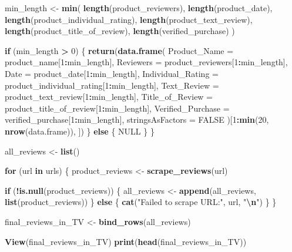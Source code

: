 \documentclass[
  11pt,
]{article}
\newenvironment{Shaded}{\begin{snugshade}}{\end{snugshade}}
\newcommand{\AttributeTok}[1]{\textcolor[rgb]{0.13,0.29,0.53}{#1}}
\newcommand{\ConstantTok}[1]{\textcolor[rgb]{0.56,0.35,0.01}{#1}}
\newcommand{\ControlFlowTok}[1]{\textcolor[rgb]{0.13,0.29,0.53}{\textbf{#1}}}
\newcommand{\DecValTok}[1]{\textcolor[rgb]{0.00,0.00,0.81}{#1}}
\newcommand{\FunctionTok}[1]{\textcolor[rgb]{0.13,0.29,0.53}{\textbf{#1}}}
\newcommand{\NormalTok}[1]{#1}
\newcommand{\OtherTok}[1]{\textcolor[rgb]{0.56,0.35,0.01}{#1}}
\newcommand{\SpecialCharTok}[1]{\textcolor[rgb]{0.81,0.36,0.00}{\textbf{#1}}}
\newcommand{\StringTok}[1]{\textcolor[rgb]{0.31,0.60,0.02}{#1}}
\begin{document}
\begin{Shaded}
\begin{Highlighting}[]
  
\NormalTok{  min\_length }\OtherTok{\textless{}{-}} \FunctionTok{min}\NormalTok{(}
    \FunctionTok{length}\NormalTok{(product\_reviewers),}
    \FunctionTok{length}\NormalTok{(product\_date),}
    \FunctionTok{length}\NormalTok{(product\_individual\_rating),}
    \FunctionTok{length}\NormalTok{(product\_text\_review),}
    \FunctionTok{length}\NormalTok{(product\_title\_of\_review),}
    \FunctionTok{length}\NormalTok{(verified\_purchase)}
\NormalTok{  )}
  
  
  \ControlFlowTok{if}\NormalTok{ (min\_length }\SpecialCharTok{\textgreater{}} \DecValTok{0}\NormalTok{) \{}
   \FunctionTok{return}\NormalTok{(}\FunctionTok{data.frame}\NormalTok{(}
      \AttributeTok{Product\_Name =}\NormalTok{ product\_name[}\DecValTok{1}\SpecialCharTok{:}\NormalTok{min\_length],}
      \AttributeTok{Reviewers =}\NormalTok{ product\_reviewers[}\DecValTok{1}\SpecialCharTok{:}\NormalTok{min\_length],}
      \AttributeTok{Date =}\NormalTok{ product\_date[}\DecValTok{1}\SpecialCharTok{:}\NormalTok{min\_length],}
      \AttributeTok{Individual\_Rating =}\NormalTok{ product\_individual\_rating[}\DecValTok{1}\SpecialCharTok{:}\NormalTok{min\_length],}
      \AttributeTok{Text\_Review =}\NormalTok{ product\_text\_review[}\DecValTok{1}\SpecialCharTok{:}\NormalTok{min\_length],}
      \AttributeTok{Title\_of\_Review =}\NormalTok{ product\_title\_of\_review[}\DecValTok{1}\SpecialCharTok{:}\NormalTok{min\_length],}
      \AttributeTok{Verified\_Purchase =}\NormalTok{ verified\_purchase[}\DecValTok{1}\SpecialCharTok{:}\NormalTok{min\_length],}
      \AttributeTok{stringsAsFactors =} \ConstantTok{FALSE}
\NormalTok{    )[}\DecValTok{1}\SpecialCharTok{:}\FunctionTok{min}\NormalTok{(}\DecValTok{20}\NormalTok{, }\FunctionTok{nrow}\NormalTok{(data.frame)), ])}
\NormalTok{  \} }\ControlFlowTok{else}\NormalTok{ \{}
    \ConstantTok{NULL}
\NormalTok{  \}}
\NormalTok{\}}


\NormalTok{all\_reviews }\OtherTok{\textless{}{-}} \FunctionTok{list}\NormalTok{()}


\ControlFlowTok{for}\NormalTok{ (url }\ControlFlowTok{in}\NormalTok{ urls) \{}
\NormalTok{  product\_reviews }\OtherTok{\textless{}{-}} \FunctionTok{scrape\_reviews}\NormalTok{(url)}
  
  \ControlFlowTok{if}\NormalTok{ (}\SpecialCharTok{!}\FunctionTok{is.null}\NormalTok{(product\_reviews)) \{}
\NormalTok{    all\_reviews }\OtherTok{\textless{}{-}} \FunctionTok{append}\NormalTok{(all\_reviews, }\FunctionTok{list}\NormalTok{(product\_reviews))}
\NormalTok{  \} }\ControlFlowTok{else}\NormalTok{ \{}
    \FunctionTok{cat}\NormalTok{(}\StringTok{"Failed to scrape URL:"}\NormalTok{, url, }\StringTok{"}\SpecialCharTok{\textbackslash{}n}\StringTok{"}\NormalTok{)}
\NormalTok{  \}}
\NormalTok{\}}


\NormalTok{final\_reviews\_in\_TV }\OtherTok{\textless{}{-}} \FunctionTok{bind\_rows}\NormalTok{(all\_reviews)}


\FunctionTok{View}\NormalTok{(final\_reviews\_in\_TV)}
\FunctionTok{print}\NormalTok{(}\FunctionTok{head}\NormalTok{(final\_reviews\_in\_TV))}
\end{Highlighting}
\end{Shaded}
\end{document}
